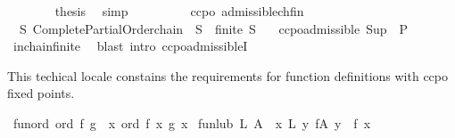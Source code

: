 \begin{isabellebody}
\ \ \ \ \ \ \isamarkupfalse%
\ {\isacharquery}{\kern0pt}thesis\ \isamarkupfalse%
\ simp\isanewline
\ \ \ \ \isamarkupfalse%
\isanewline
\ \ \isamarkupfalse%
\isanewline
{}\isamarkupfalse%
%
\endisatagproof
{\isafoldproof}%
%
\isadelimproof
\isanewline
%
\endisadelimproof
\isanewline
{}\isamarkupfalse%
\ {\isacharparenleft}{\kern0pt}\ ccpo{\isacharparenright}{\kern0pt}\ admissible{\isacharunderscore}{\kern0pt}chfin{\isacharcolon}{\kern0pt}\isanewline
\ \ {\isachardoublequoteopen}{\isacharparenleft}{\kern0pt}{\isasymforall}S{\isachardot}{\kern0pt}\ Complete{\isacharunderscore}{\kern0pt}Partial{\isacharunderscore}{\kern0pt}Order{\isachardot}{\kern0pt}chain\ {\isacharparenleft}{\kern0pt}{\isasymle}{\isacharparenright}{\kern0pt}\ S\ {\isasymlongrightarrow}\ finite\ S{\isacharparenright}{\kern0pt}\isanewline
\ \ {\isasymLongrightarrow}\ ccpo{\isachardot}{\kern0pt}admissible\ Sup\ {\isacharparenleft}{\kern0pt}{\isasymle}{\isacharparenright}{\kern0pt}\ P{\isachardoublequoteclose}\isanewline
%
\isadelimproof
%
\endisadelimproof
%
\isatagproof
{}\isamarkupfalse%
\ in{\isacharunderscore}{\kern0pt}chain{\isacharunderscore}{\kern0pt}finite\ \isamarkupfalse%
\ {\isacharparenleft}{\kern0pt}blast\ intro{\isacharcolon}{\kern0pt}\ ccpo{\isachardot}{\kern0pt}admissibleI{\isacharparenright}{\kern0pt}%
\endisatagproof
{\isafoldproof}%
%
\isadelimproof
%
\endisadelimproof
%
\isadelimdocument
%
\endisadelimdocument
%
\isatagdocument
%
\isamarkuptrue%
%
\endisatagdocument
{\isafolddocument}%
%
\isadelimdocument
%
\endisadelimdocument
%
\begin{isamarkuptext}%
This techical locale constains the requirements for function
  definitions with ccpo fixed points.%
\end{isamarkuptext}\isamarkuptrue%
\isamarkupfalse%
\ {\isachardoublequoteopen}fun{\isacharunderscore}{\kern0pt}ord\ ord\ f\ g\ {\isasymlongleftrightarrow}\ {\isacharparenleft}{\kern0pt}{\isasymforall}x{\isachardot}{\kern0pt}\ ord\ {\isacharparenleft}{\kern0pt}f\ x{\isacharparenright}{\kern0pt}\ {\isacharparenleft}{\kern0pt}g\ x{\isacharparenright}{\kern0pt}{\isacharparenright}{\kern0pt}{\isachardoublequoteclose}\isanewline
{}\isamarkupfalse%
\ {\isachardoublequoteopen}fun{\isacharunderscore}{\kern0pt}lub\ L\ A\ {\isacharequal}{\kern0pt}\ {\isacharparenleft}{\kern0pt}{\isasymlambda}x{\isachardot}{\kern0pt}\ L\ {\isacharbraceleft}{\kern0pt}y{\isachardot}{\kern0pt}\ {\isasymexists}f{\isasymin}A{\isachardot}{\kern0pt}\ y\ {\isacharequal}{\kern0pt}\ f\ x{\isacharbraceright}{\kern0pt}{\isacharparenright}{\kern0pt}{\isachardoublequoteclose}\isanewline

\end{isabellebody}
